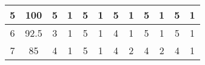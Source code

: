 \documentclass[12pt,a4paper]{report}
\begin{document}
\begin{sidewaystable}
\begin{tabular}{|c|c|c|c|c|c|c|c|c|c|c|c|}
5                                                               & {\color[HTML]{EA4335} 100}                                                           & 5                                                            & 1                                                            & 5                                                            & 1                                                            & 5                                                            & 1                                                            & 5                                                            & 1                                                            & 5                                                            & 1                                                             \\ \hline
6                                                               & {\color[HTML]{EA4335} 92.5}                                                          & 3                                                            & 1                                                            & 5                                                            & 1                                                            & 4                                                            & 1                                                            & 5                                                            & 1                                                            & 5                                                            & 1                                                             \\ \hline
7                                                               & {\color[HTML]{EA4335} 85}                                                            & 4                                                            & 1                                                            & 5                                                            & 1                                                            & 4                                                            & 2                                                            & 4                                                            & 2                                                            & 4                                                            & 1                                                             \\ \hline

\end{tabular}
\end{sidewaystable}
\end{document}
